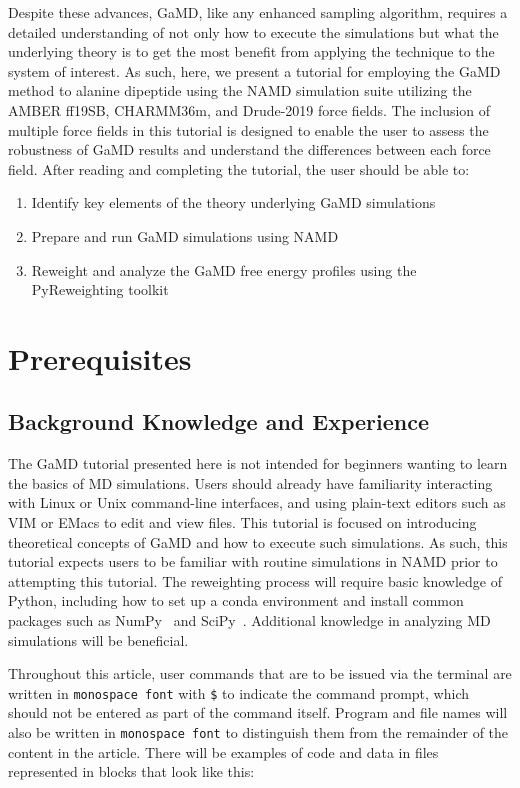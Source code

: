 \documentclass[9pt,tutorial,pubversion]{livecoms}
\begin{document}
Despite these advances, GaMD, like any enhanced sampling algorithm, requires a detailed understanding of not only how to execute the simulations but what the underlying theory is to get the most benefit from applying the technique to the system of interest. As such, here, we present a tutorial for employing the GaMD method to alanine dipeptide using the NAMD simulation suite utilizing the AMBER ff19SB, CHARMM36m, and Drude-2019 force fields. The inclusion of multiple force fields in this tutorial is designed to enable the user to assess the robustness of GaMD results and understand the differences between each force field. After reading and completing the tutorial, the user should be able to:
\begin{enumerate}
    \item Identify key elements of the theory underlying GaMD simulations
    \item Prepare and run GaMD simulations using NAMD
    \item Reweight and analyze the GaMD free energy profiles using the PyReweighting toolkit
\end{enumerate}

\section{Prerequisites}
\subsection{Background Knowledge and Experience}
The GaMD tutorial presented here is not intended for beginners wanting to learn the basics of MD simulations. Users should already have familiarity interacting with Linux or Unix command-line interfaces, and using plain-text editors such as VIM or EMacs to edit and view files. This tutorial is focused on introducing theoretical concepts of GaMD and how to execute such simulations. As such, this tutorial expects users to be familiar with routine simulations in NAMD prior to attempting this tutorial. The reweighting process will require basic knowledge of Python, including how to set up a conda environment and install common packages such as NumPy~\cite{numpy} and SciPy~\cite{scipy}. Additional knowledge in analyzing MD simulations will be beneficial.

Throughout this article, user commands that are to be issued via the terminal are written in \texttt{monospace font} with \texttt{\$} to indicate the command prompt, which should not be entered as part of the command itself. Program and file names will also be written in \texttt{monospace font} to distinguish them from the remainder of the content in the article. There will be examples of code and data in files represented in blocks that look like this:
\end{document}
